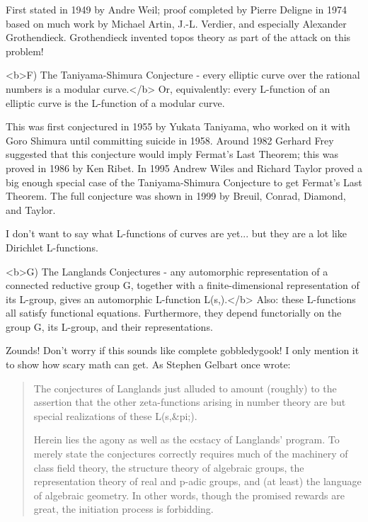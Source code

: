 First stated in 1949 by Andre Weil; proof completed by Pierre Deligne 
in 1974 based on much work by Michael Artin, J.-L. Verdier, and especially 
Alexander Grothendieck.  Grothendieck invented topos theory as part of 
the attack on this problem!

<b>F) The Taniyama-Shimura Conjecture - every elliptic curve over the rational 
numbers is a modular curve.</b>  Or, equivalently: every L-function of an 
elliptic curve is the L-function of a modular curve.  

This was first conjectured in 1955 by Yukata Taniyama, who worked on it 
with Goro Shimura until committing suicide in 1958.  Around 1982 Gerhard 
Frey suggested that this conjecture would imply Fermat's Last Theorem; this 
was proved in 1986 by Ken Ribet.  In 1995 Andrew Wiles and Richard Taylor 
proved a big enough special case of the Taniyama-Shimura Conjecture to get 
Fermat's Last Theorem.  The full conjecture was shown in 1999 by Breuil, 
Conrad, Diamond, and Taylor.

I don't want to say what L-functions of curves are yet... but they
are a lot like Dirichlet L-functions.

<b>G) The Langlands Conjectures - any automorphic representation \pi  of a 
connected reductive group G, together with a finite-dimensional representation 
of its L-group, gives an automorphic L-function L(s,\pi ).</b>  Also:
these L-functions 
all satisfy functional equations.  Furthermore, they depend functorially on
the group G, its L-group, and their representations. 

Zounds!  Don't worry if this sounds like complete gobbledygook!  I only 
mention it to show how scary math can get.  As Stephen Gelbart once wrote:

\begin{quote}
     The conjectures of Langlands just alluded to amount (roughly)
     to the assertion that the other zeta-functions arising in 
     number theory are but special realizations of these L(s,&pi;).

     Herein lies the agony as well as the ecstacy of Langlands'
     program.  To merely state the conjectures correctly requires
     much of the machinery of class field theory, the structure
     theory of algebraic groups, the representation theory of real
     and p-adic groups, and (at least) the language of algebraic
     geometry.  In other words, though the promised rewards are 
     great, the initiation process is forbidding.
\end{quote}
    
